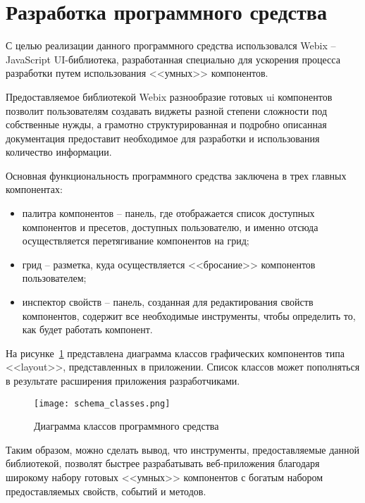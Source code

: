 \section{Разработка программного средства} 
\label{sec:development}

С целью реализации данного программного средства использовался Webix -- JavaScript UI-библиотека, разработанная специально для ускорения процесса разработки путем использования <<умных>> компонентов.

Предоставляемое библиотекой Webix разнообразие готовых ui компонентов позволит пользователям создавать виджеты разной степени сложности под собственные нужды, а грамотно структурированная и подробно описанная документация предоставит необходимое для разработки и использования количество информации.

Основная функциональность программного средства заключена в трех главных компонентах: 
\begin{itemize}
	\item палитра компонентов -- панель, где отображается список доступных компонентов и пресетов, доступных пользователю, и именно отсюда осуществляется перетягивание компонентов на грид;
	\item грид -- разметка, куда осуществляется <<бросание>> компонентов пользователем;
	\item инспектор свойств -- панель, созданная для редактирования свойств компонентов, содержит все необходимые инструменты, чтобы определить то, как будет работать компонент.
\end{itemize}
  
На рисунке~\ref{sec:development:schema_classes} представлена диаграмма классов графических компонентов типа <<layout>>, представленных в приложении. Список классов может пополняться в результате расширения приложения разработчиками.\pagebreak

\begin{figure}[ht]
  \centering
    \texttt{[image: schema\_classes.png]}
    \caption{Диаграмма классов программного средства}
    \label{sec:development:schema_classes}
\end{figure}








Таким образом, можно сделать вывод, что инструменты, предоставляемые данной библиотекой, позволят быстрее разрабатывать веб-приложения благодаря широкому набору готовых <<умных>> компонентов с богатым набором предоставляемых свойств, событий и методов.